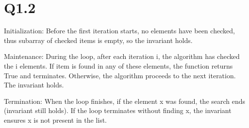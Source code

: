 \documentclass{article}
\begin{document}
\section{Q1.2}

Initialization:
Before the first iteration starts, no elements have been checked, thus subarray of checked items is empty, so the invariant holds.

Maintenance:
During the loop, after each iteration i, the algorithm has checked the i elements. If item is found in any of these elements, the function returns True and terminates. Otherwise, the algorithm proceeds to the next iteration. The invariant holds.

Termination:
When the loop finishes, if the element x was found, the search ends (invariant still holds). If the loop terminates without finding x, the invariant ensures x is not present in the list.
\end{document}
